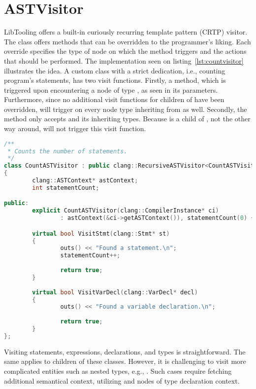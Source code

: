 \section{ASTVisitor}


LibTooling offers a built-in curiously recurring template pattern 
(CRTP) visitor. 
The class  offers  methods that 
can be overridden to the programmer's liking. 
Each override specifies the type of node on which the method 
triggers and the actions that should be performed.
The implementation seen on listing~\ref{lst:countvisitor} illustrates
the idea. A custom class with a strict dedication, i.e., counting
program's statements, has two visit functions.
Firstly, a  method, which is triggered upon
encountering a node of type , as seen in its
parameters. 
Furthermore, since no additional visit functions for children 
of  have been overridden, 
will trigger on every node type inheriting from  as well.
Secondly, the method  only accepts 
and its inheriting types.
Because  is a child of , not the other way
around,  will not trigger this visit function.

\begin{lstlisting}[caption=CountASTVisitor, language=C++, 
label={lst:countvisitor}]
/**
 * Counts the number of statements.
 */
class CountASTVisitor : public clang::RecursiveASTVisitor<CountASTVisitor>
{
        clang::ASTContext* astContext;
        int statementCount;

public:
        explicit CountASTVisitor(clang::CompilerInstance* ci)
                : astContext(&ci->getASTContext()), statementCount(0) { }

        virtual bool VisitStmt(clang::Stmt* st)
        {
                outs() << "Found a statement.\n";
				statementCount++;
				
                return true;
        }
		
		virtual bool VisitVarDecl(clang::VarDecl* decl)
        {
                outs() << "Found a variable declaration.\n";
				
                return true;
        }
};
\end{lstlisting}

Visiting statements, expressions, declarations, 
and types is straightforward. 
The same applies to children of these classes. 
However, it is challenging to visit more complicated entities 
such as nested types, e.g., . 
Such cases require fetching additional semantical context, 
utilizing  and nodes of type declaration context.

